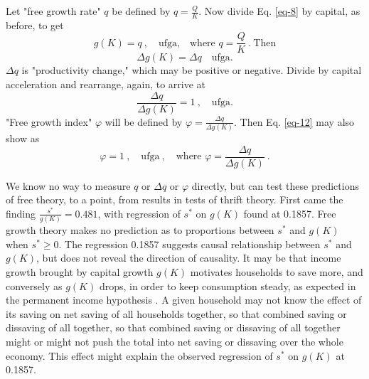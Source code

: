 \documentclass[a4paper,fleqn]{latex_styles/cas-sc}
\begin{document}
Let "free growth rate" \(q\) be defined by \(q = \frac{Q}{K}\). Now divide Eq. \eqref{eq-8} by capital, as before, to get
%
\begin{equation}
g(K) = q\ ,\quad \text{ufga,} \quad \text{where } q = \frac{Q}{K}\ .\ \text{Then} \label{eq-10}
\end{equation}
\vspace{-5ex}
\begin{equation}
\Delta g(K) = \Delta q \quad \text{ufga.} \label{eq-11}
\end{equation}
%
\(\Delta q\) is "productivity change," which may be positive or negative. Divide by capital acceleration and rearrange, again, to arrive at 
%
\begin{equation}
\frac{\Delta q}{\Delta g(K)} = 1 \ ,\quad \text{ufga.} \label{eq-12}
\end{equation}
%
"Free growth index" \(\varphi\) will be defined by \(\varphi = \frac{\Delta q}{\Delta g(K)}\). Then Eq. \eqref{eq-12} may also show as
%
\begin{equation}
\varphi = 1\ ,\quad \text{ufga}\ ,\quad \text{where } \varphi = \frac{\Delta q}{\Delta g(K)}\ .\label{eq-13}
\end{equation}
%

We know no way to measure \(q\) or \(\Delta q\) or \(\varphi\) directly, but can test these predictions of free theory, to a point, from results in tests of thrift theory. First came the finding \(\frac{s^*}{g(K)} = 0.481\), with regression of \(s^*\) on \(g(K)\) found at 0.1857.
Free growth theory makes no prediction as to proportions between \(s^*\) and \(g(K)\) when \(s^* \geq 0\). 
The regression 0.1857 suggests causal relationship between \(s^*\) and \(g(K)\), but does not reveal the direction of causality. It may be that income growth brought by capital growth \(g(K)\) motivates households to save more, and conversely as \(g(K)\) drops, in order to keep consumption steady, as expected in the permanent income hypothesis \citep{friedman1957permanent}. A given household may not know the effect of its saving on net saving of all households together, so that combined saving or dissaving of all together, so that combined saving or dissaving of all together might or might not push the total into net saving or dissaving over the whole economy. This effect might explain the observed regression of \(s^*\) on \(g(K)\) at 0.1857.
\end{document}

